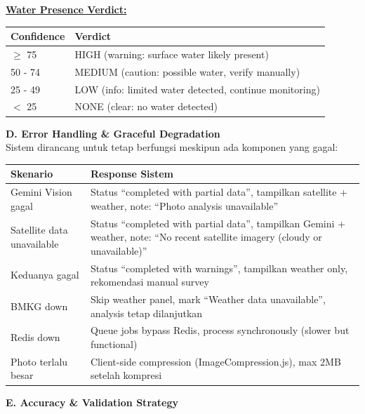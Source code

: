 \documentclass[12pt,a4paper]{article}
\newcommand{\subsectionbox}[1]{%
  \textbf{\large #1}\\[0.3cm]
}
\begin{document}
\textbf{\underline{Water Presence Verdict:}}

\begin{tabularx}{\textwidth}{|l|X|}
  \hline
  \textbf{Confidence} & \textbf{Verdict} \\
  \hline
  $\ge$ 75 & HIGH (warning: surface water likely present) \\
  50 - 74 & MEDIUM (caution: possible water, verify manually) \\
  25 - 49 & LOW (info: limited water detected, continue monitoring) \\
  $<$ 25 & NONE (clear: no water detected) \\
  \hline
\end{tabularx}

\vspace{0.5cm}

\subsectionbox{D. Error Handling \& Graceful Degradation}

Sistem dirancang untuk tetap berfungsi meskipun ada komponen yang gagal:

\begin{tabularx}{\textwidth}{|l|X|}
  \hline
  \textbf{Skenario} & \textbf{Response Sistem} \\
  \hline
  Gemini Vision gagal & Status ``completed with partial data'', tampilkan satellite + weather, note: ``Photo analysis unavailable'' \\
  Satellite data unavailable & Status ``completed with partial data'', tampilkan Gemini + weather, note: ``No recent satellite imagery (cloudy or unavailable)'' \\
  Keduanya gagal & Status ``completed with warnings'', tampilkan weather only, rekomendasi manual survey \\
  BMKG down & Skip weather panel, mark ``Weather data unavailable'', analysis tetap dilanjutkan \\
  Redis down & Queue jobs bypass Redis, process synchronously (slower but functional) \\
  Photo terlalu besar & Client-side compression (ImageCompression.js), max 2MB setelah kompresi \\
  \hline
\end{tabularx}

\vspace{0.5cm}

\subsectionbox{E. Accuracy \& Validation Strategy}
\end{document}
